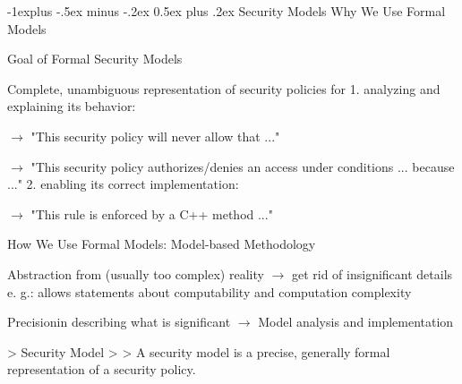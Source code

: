 \documentclass[a4paper]{article}
\makeatletter
\renewcommand{\subsection}{\@startsection{subsection}{2}{0mm}%
                                {-1explus -.5ex minus -.2ex}%
                                {0.5ex plus .2ex}%
                                {\normalfont\normalsize\bfseries}}
\makeatother
\begin{document}
\begin{multicols}{3}



    \subsection{Security Models}
    Why We Use Formal Models

    Goal of Formal Security Models
    \begin{itemize*}
        \item Complete, unambiguous representation of security policies for
              1. analyzing and explaining its behavior:
              \begin{itemize*}
                  \item $\rightarrow$  "This security policy will never allow that ..."
                  \item $\rightarrow$  "This security policy authorizes/denies an access under conditions ... because ..."
                        2. enabling its correct implementation:
                  \item $\rightarrow$ "This rule is enforced by a C++ method ..."
              \end{itemize*}
    \end{itemize*}

    How We Use Formal Models: Model-based Methodology
    \begin{itemize*}
        \item Abstraction from (usually too complex) reality $\rightarrow$  get rid of insignificant details e. g.: allows statements about computability and computation complexity
        \item Precisionin describing what is significant $\rightarrow$  Model analysis and implementation
    \end{itemize*}

    > Security Model
    >
    > A security model is a precise, generally formal representation of a security policy.


\end{multicols}
\end{document}
